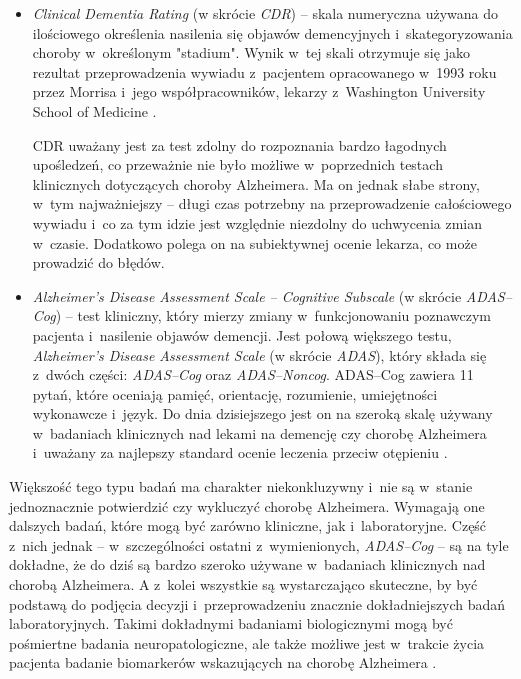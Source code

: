 \begin{itemize}
  \item \emph{Clinical Dementia Rating} (w skrócie \emph{CDR}) -- skala numeryczna używana do ilościowego określenia nasilenia się objawów demencyjnych i~skategoryzowania choroby w~określonym "stadium".
        Wynik w~tej skali otrzymuje się jako rezultat przeprowadzenia wywiadu z~pacjentem opracowanego w~1993 roku przez Morrisa i~jego współpracowników, lekarzy z~Washington University School of Medicine \cite{morris1993clinical}.

        CDR uważany jest za test zdolny do rozpoznania bardzo łagodnych upośledzeń, co przeważnie nie było możliwe w~poprzednich testach klinicznych dotyczących choroby Alzheimera.
        Ma on jednak słabe strony, w~tym najważniejszy -- długi czas potrzebny na przeprowadzenie całościowego wywiadu i~co za tym idzie jest względnie niezdolny do uchwycenia zmian w~czasie.
        Dodatkowo polega on na subiektywnej ocenie lekarza, co może prowadzić do błędów.

  \item \emph{Alzheimer's Disease Assessment Scale -- Cognitive Subscale} (w skrócie \emph{ADAS--Cog}) -- test kliniczny, który mierzy zmiany w~funkcjonowaniu poznawczym pacjenta i~nasilenie objawów demencji.
        Jest połową większego testu, \emph{Alzheimer's Disease Assessment Scale} (w skrócie \emph{ADAS}), który składa się z~dwóch części: \emph{ADAS--Cog} oraz \emph{ADAS--Noncog}.
        ADAS--Cog zawiera 11 pytań, które oceniają pamięć, orientację, rozumienie, umiejętności wykonawcze i~język.
        Do dnia dzisiejszego jest on na szeroką skalę używany w~badaniach klinicznych nad lekami na demencję czy chorobę Alzheimera i~uważany za najlepszy standard  ocenie leczenia przeciw otępieniu \cite{connor2008administration}.

\end{itemize}

Większość tego typu badań ma charakter niekonkluzywny i~nie są w~stanie jednoznacznie potwierdzić czy wykluczyć chorobę Alzheimera.
Wymagają one dalszych badań, które mogą być zarówno kliniczne, jak i~laboratoryjne.
Część z~nich jednak -- w~szczególności ostatni z~wymienionych, \emph{ADAS--Cog} -- są na tyle dokładne, że do dziś są bardzo szeroko używane w~badaniach klinicznych nad chorobą Alzheimera.
A z~kolei wszystkie są wystarczająco skuteczne, by być podstawą do podjęcia decyzji i~przeprowadzeniu znacznie dokładniejszych badań laboratoryjnych.
Takimi dokładnymi badaniami biologicznymi mogą być pośmiertne badania neuropatologiczne, ale także możliwe jest w~trakcie życia pacjenta badanie biomarkerów wskazujących na chorobę Alzheimera \cite{mantzavinos2017biomarkers}.

